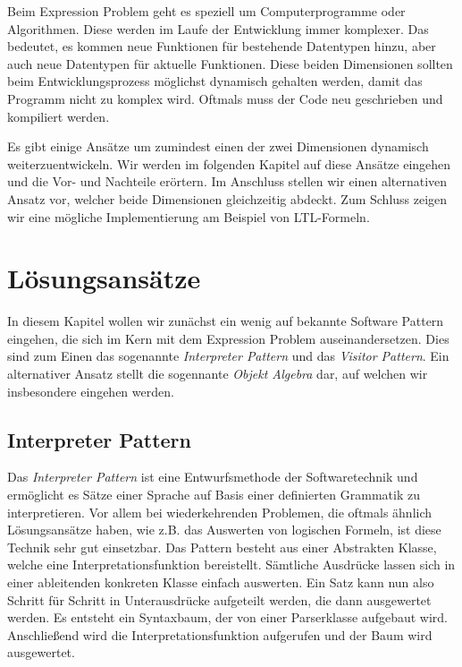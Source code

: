 \documentclass{llncs}
\begin{document}
Beim Expression Problem geht es speziell um Computerprogramme oder Algorithmen. Diese werden im Laufe der Entwicklung immer komplexer. Das bedeutet, es kommen neue Funktionen für bestehende Datentypen hinzu, aber auch neue Datentypen für aktuelle Funktionen. Diese beiden Dimensionen sollten beim Entwicklungsprozess möglichst dynamisch gehalten werden, damit das Programm nicht zu komplex wird. Oftmals muss der Code neu geschrieben und kompiliert werden. 

Es gibt einige Ansätze um zumindest einen der zwei Dimensionen dynamisch weiterzuentwickeln. Wir werden im folgenden Kapitel auf diese Ansätze eingehen und die Vor- und Nachteile erörtern. Im Anschluss stellen wir einen alternativen Ansatz vor, welcher beide Dimensionen gleichzeitig abdeckt. Zum Schluss zeigen wir eine mögliche Implementierung am Beispiel von LTL-Formeln.   

\section{Lösungsansätze} \label{sec:approaches}

In diesem Kapitel wollen wir zunächst ein wenig auf bekannte Software Pattern eingehen, die sich im Kern mit dem Expression Problem auseinandersetzen. Dies sind zum Einen das sogenannte \emph{Interpreter Pattern} und das \emph{Visitor Pattern}. Ein alternativer Ansatz stellt die sogennante \emph{Objekt Algebra} dar, auf welchen wir insbesondere eingehen werden. 

\subsection{Interpreter Pattern} \label{sec:interpreter}

Das \emph{Interpreter Pattern} ist eine Entwurfsmethode der Softwaretechnik und ermöglicht es Sätze einer Sprache auf Basis einer definierten Grammatik zu interpretieren. Vor allem bei wiederkehrenden Problemen, die oftmals ähnlich Lösungsansätze haben, wie z.B. das Auswerten von logischen Formeln, ist diese Technik sehr gut einsetzbar. Das Pattern besteht aus einer Abstrakten Klasse, welche eine Interpretationsfunktion bereistellt. Sämtliche Ausdrücke lassen sich in einer ableitenden konkreten Klasse einfach auswerten. Ein Satz kann nun also Schritt für Schritt in Unterausdrücke aufgeteilt werden, die dann ausgewertet werden. Es entsteht ein Syntaxbaum, der von einer Parserklasse aufgebaut wird. Anschließend wird die Interpretationsfunktion aufgerufen und der Baum wird ausgewertet. 
\end{document}

